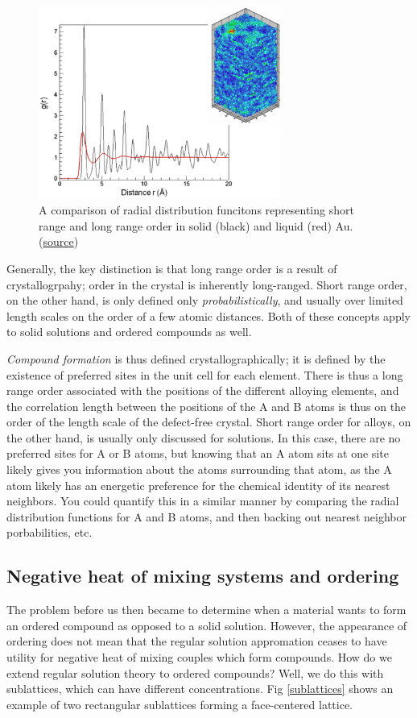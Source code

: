 \documentclass[12pt]{article}
\begin{document}
\begin{figure}[h]
\centering
\includegraphics[width=8cm]{regularsolutionsandBraggwilliamsnotes_gr6}
\caption{A comparison of radial distribution funcitons representing short range and long range order in solid (black) and liquid (red) Au. (\href{http://people.virginia.edu/\~lz2n/mse627/notes/Correlations.pdf}{source})}
\label{liquidAndCrystallineRDF}
\end{figure}
Generally, the key distinction is that long range order is a result of crystallogrpahy; order in the crystal is inherently long-ranged. Short range order, on the other hand, is only defined only \textit{probabilistically}, and usually over limited length scales on the order of a few atomic distances. Both of these concepts apply to solid solutions and ordered compounds as well. \par
\textit{Compound formation} is thus defined crystallographically; it is defined by the existence of preferred sites in the unit cell for
each element. There is thus a long range order associated with the positions of the different alloying elements, and the correlation length between
the positions of the A and B atoms is thus on the order of the length scale of the defect-free crystal. Short range order for alloys, on the other
hand, is usually only discussed for solutions. In this case, there are no preferred sites for A or B atoms, but knowing that an A atom sits at one
site likely gives you information about the atoms surrounding that atom, as the A atom likely has an energetic preference for the chemical identity
of its nearest neighbors. You could quantify this in a similar manner by comparing the radial distribution functions for A and B atoms, and then
backing out nearest neighbor porbabilities, etc.
\subsection{Negative heat of mixing systems and ordering}
The problem before us then became to determine when a material wants to form an ordered compound as opposed to a solid solution. However,
the appearance of ordering does not mean that the regular solution appromation ceases to have utility for negative heat of mixing couples which form
compounds. How do we extend regular solution theory to ordered compounds? Well, we do this with sublattices, which can have different concentrations. Fig \ref{sublattices} shows an example of two rectangular sublattices forming a face-centered lattice.
\end{document}
